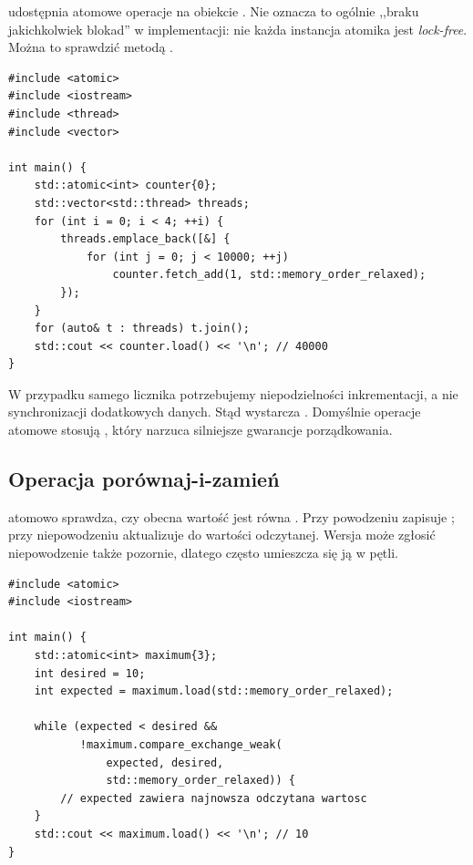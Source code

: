  udostępnia atomowe operacje na obiekcie .
Nie oznacza to ogólnie ,,braku jakichkolwiek blokad'' w implementacji:
nie każda instancja atomika jest \emph{lock-free}. Można to sprawdzić
metodą .

\begin{lstlisting}[caption={Licznik atomowy z porządkiem relaxed (C++11).}]
#include <atomic>
#include <iostream>
#include <thread>
#include <vector>

int main() {
    std::atomic<int> counter{0};
    std::vector<std::thread> threads;
    for (int i = 0; i < 4; ++i) {
        threads.emplace_back([&] {
            for (int j = 0; j < 10000; ++j)
                counter.fetch_add(1, std::memory_order_relaxed);
        });
    }
    for (auto& t : threads) t.join();
    std::cout << counter.load() << '\n'; // 40000
}
\end{lstlisting}

W przypadku samego licznika potrzebujemy niepodzielności inkrementacji,
a nie synchronizacji dodatkowych danych. Stąd wystarcza
. Domyślnie operacje atomowe stosują
, który narzuca silniejsze gwarancje porządkowania.

\subsection{Operacja porównaj-i-zamień}

 atomowo sprawdza, czy
obecna wartość jest równa . Przy powodzeniu zapisuje
; przy niepowodzeniu aktualizuje  do wartości
odczytanej. Wersja  może zgłosić niepowodzenie także pozornie,
dlatego często umieszcza się ją w pętli.

\begin{lstlisting}[caption={Atomowe podnoszenie wartości do zadanego minimum (C++11).}]
#include <atomic>
#include <iostream>

int main() {
    std::atomic<int> maximum{3};
    int desired = 10;
    int expected = maximum.load(std::memory_order_relaxed);

    while (expected < desired &&
           !maximum.compare_exchange_weak(
               expected, desired,
               std::memory_order_relaxed)) {
        // expected zawiera najnowsza odczytana wartosc
    }
    std::cout << maximum.load() << '\n'; // 10
}
\end{lstlisting}

